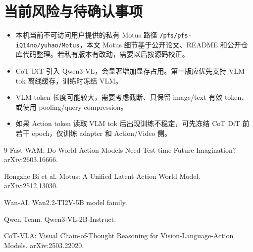 \documentclass[UTF8,a4paper,11pt]{ctexart}
\begin{document}
\section{当前风险与待确认事项}

\begin{itemize}[leftmargin=1.6em]
  \item 本机当前不可访问用户提供的私有 Motus 路径 \texttt{/pfs/pfs-iQ14no/yuhao/Motus}，本文 Motus 细节基于公开论文、README 和公开仓库代码整理。若私有版本有改动，需要以后按源码校正。
  \item CoT DiT 引入 Qwen3-VL，会显著增加显存占用。第一版应优先支持 VLM tok 离线缓存，训练时冻结 VLM。
  \item VLM token 长度可能较大，需要考虑截断、只保留 image/text 有效 token、或使用 pooling/query compression。
  \item 如果 Action token 读取 VLM tok 后出现训练不稳定，可先冻结 CoT DiT 前若干 epoch，仅训练 adapter 和 Action/Video 侧。
\end{itemize}

\begin{thebibliography}{9}
Fast-WAM: Do World Action Models Need Test-time Future Imagination? arXiv:2603.16666.

Hongzhe Bi et al. Motus: A Unified Latent Action World Model. arXiv:2512.13030.

Wan-AI. Wan2.2-TI2V-5B model family.

Qwen Team. Qwen3-VL-2B-Instruct.

CoT-VLA: Visual Chain-of-Thought Reasoning for Vision-Language-Action Models. arXiv:2503.22020.
\end{thebibliography}
\end{document}
